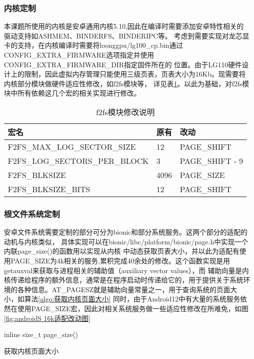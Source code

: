 \subsubsection{内核定制}
本课题所使用的内核是安卓通用内核5.10,因此在编译时需要添加安卓特性相关的驱动支持如ASHMEM、BINDERFS、BINDERIPC等。
考虑到需要实现对龙芯显卡的支持，在内核编译时需要将loonggpu/lg100\_cp.bin通过CONFIG\_EXTRA\_FIRMWARE选项指定并使用CONFIG\_EXTRA\_FIRMWARE\_DIR指定固件所在的
位置。由于LG110硬件设计上的限制，因此虚拟内存管理只能使用三级页表，页表大小为16Kb。现需要将内核部分模块做硬件适应性修改，如f2fs模块等，
详见表\ref{tab:f2fs模块修改说明}。以此为基础，对f2fs模块中所有依赖这几个宏的相关实现进行修改。

\begin{table}[h]
  \centering
  \caption{f2fs模块修改说明}
  \label{tab:f2fs模块修改说明}
  \begin{tabular}{lll}
    \toprule
    宏名   &   原有  &改动  \\
    \midrule
    F2FS\_MAX\_LOG\_SECTOR\_SIZE & 12 & PAGE\_SHIFT \\
    F2FS\_LOG\_SECTORS\_PER\_BLOCK & 3 & PAGE\_SHIFT - 9 \\
    F2FS\_BLKSIZE & 4096 & PAGE\_SIZE \\
    F2FS\_BLKSIZE\_BITS & 12 & PAGE\_SHIFT \\
    \bottomrule
  \end{tabular}
  \note{}
\end{table}

\subsubsection{根文件系统定制}
安卓文件系统需要定制的部分可分为bionic和部分系统服务。这两个部分的适配的动机与内核类似，
具体实现可以在bionic/libc/platform/bionic/page.h中实现一个内联page\_size()的函数用以实现从内核
中动态获取页表大小，并以此为适配有使用PAGE\_SIZE为4k相关的服务,累积完成40余处的修改。这个函数实现是用getauxval来获取与进程相关的辅助值（auxiliary vector values），而
辅助向量是内核传递给程序的额外信息，通常是在程序启动时传递给它的，用于提供关于系统环境的各种信息。AT\_PAGESZ就是辅助向量常量之一，用于查询系统的页面大小，如算法\ref{algo:获取内核页面大小}
同时，由于Android12中有大量的系统服务依然在使用PAGE\_SIZE宏，因此对相关系统服务做一些适应性修改在所难免，如图\ref{fig:androidS 16k适配改动图}
\begin{algorithm}[H]
  \SetAlgoLined
  inline size\_t page\_size(){\\
  }
  \caption{获取内核页面大小}
  \label{algo:获取内核页面大小}
\end{algorithm}

